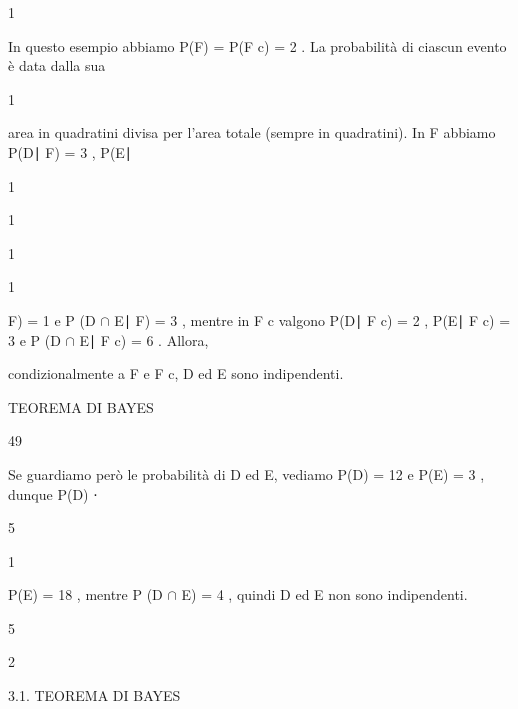 \documentclass[a4paper,portrait,12pt]{article}
\begin{document}
1


\begin{flushleft}
In questo esempio abbiamo P(F) = P(F c) = 2 . La probabilit\`{a} di ciascun evento \`{e} data dalla sua
\end{flushleft}


1


\begin{flushleft}
area in quadratini divisa per l'area totale (sempre in quadratini). In F abbiamo P(D∣ F) = 3 , P(E∣
\end{flushleft}


1


1


1


1


\begin{flushleft}
F) = 1 e P (D $\cap$ E∣ F) = 3 , mentre in F c valgono P(D∣ F c) = 2 , P(E∣ F c) = 3 e P (D $\cap$ E∣ F c) = 6 . Allora,
\end{flushleft}


\begin{flushleft}
condizionalmente a F e F c, D ed E sono indipendenti.
\end{flushleft}





\begin{flushleft}
 TEOREMA DI BAYES
\end{flushleft}





49





\begin{flushleft}
Se guardiamo per\`{o} le probabilit\`{a} di D ed E, vediamo P(D) = 12 e P(E) = 3 , dunque P(D) ⋅
\end{flushleft}


5


1


\begin{flushleft}
P(E) = 18 , mentre P (D $\cap$ E) = 4 , quindi D ed E non sono indipendenti.
\end{flushleft}


5





2





\begin{flushleft}
3.1. TEOREMA DI BAYES
\end{flushleft}
\end{document}
